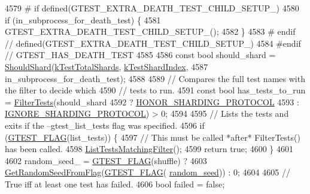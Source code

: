 \begin{DoxyCode}
{4579 \textcolor{preprocessor}{# if defined(GTEST\_EXTRA\_DEATH\_TEST\_CHILD\_SETUP\_)}
4580   \textcolor{keywordflow}{if} (in\_subprocess\_for\_death\_test) \{
4581     GTEST\_EXTRA\_DEATH\_TEST\_CHILD\_SETUP\_();
4582   \}
4583 \textcolor{preprocessor}{# endif  // defined(GTEST\_EXTRA\_DEATH\_TEST\_CHILD\_SETUP\_)}
4584 \textcolor{preprocessor}{#endif  // GTEST\_HAS\_DEATH\_TEST}
4585 
4586   \textcolor{keyword}{const} \textcolor{keywordtype}{bool} should\_shard = \hyperlink{namespacetesting_1_1internal_a0fe41657b1d1ab7ec4e37ec07403ee6c}{ShouldShard}(\hyperlink{namespacetesting_a7542311baba200ebabd4065717606f6e}{kTestTotalShards}, 
      \hyperlink{namespacetesting_a5f76dfdb8cb2664da54e320ecaba3643}{kTestShardIndex},
4587                                         in\_subprocess\_for\_death\_test);
4588 
4589   \textcolor{comment}{// Compares the full test names with the filter to decide which}
4590   \textcolor{comment}{// tests to run.}
4591   \textcolor{keyword}{const} \textcolor{keywordtype}{bool} has\_tests\_to\_run = \hyperlink{classtesting_1_1internal_1_1UnitTestImpl_abd47e447f0c2557ed528db0350671bed}{FilterTests}(should\_shard
4592                                               ? \hyperlink{classtesting_1_1internal_1_1UnitTestImpl_acc5ffd3f9bc2e87bb3dba4218f58af43abec11f1c4bb8a3e2b99fa8328bccd58c}{HONOR\_SHARDING\_PROTOCOL}
4593                                               : \hyperlink{classtesting_1_1internal_1_1UnitTestImpl_acc5ffd3f9bc2e87bb3dba4218f58af43a68bd0b7e6a7bead14c93d1a42144095a}{IGNORE\_SHARDING\_PROTOCOL}) > 0;
4594 
4595   \textcolor{comment}{// Lists the tests and exits if the --gtest\_list\_tests flag was specified.}
4596   \textcolor{keywordflow}{if} (\hyperlink{gtest-port_8h_a828f4e34a1c4b510da50ec1563e3562a}{GTEST\_FLAG}(list\_tests)) \{
4597     \textcolor{comment}{// This must be called *after* FilterTests() has been called.}
4598     \hyperlink{classtesting_1_1internal_1_1UnitTestImpl_ad2cfedef41d3d29aad23c2c64214e6f3}{ListTestsMatchingFilter}();
4599     \textcolor{keywordflow}{return} \textcolor{keyword}{true};
4600   \}
4601 
4602   random\_seed\_ = \hyperlink{gtest-port_8h_a828f4e34a1c4b510da50ec1563e3562a}{GTEST\_FLAG}(shuffle) ?
4603       \hyperlink{namespacetesting_1_1internal_ae74fedbdaebaac8d1202192266243b9e}{GetRandomSeedFromFlag}(\hyperlink{gtest-port_8h_a828f4e34a1c4b510da50ec1563e3562a}{GTEST\_FLAG}(
      \hyperlink{classtesting_1_1internal_1_1UnitTestImpl_a8ec59a7ab3bad96bccde98ce85ffc864}{random\_seed})) : 0;
4604 
4605   \textcolor{comment}{// True iff at least one test has failed.}
4606   \textcolor{keywordtype}{bool} failed = \textcolor{keyword}{false};
}
\end{DoxyCode}
